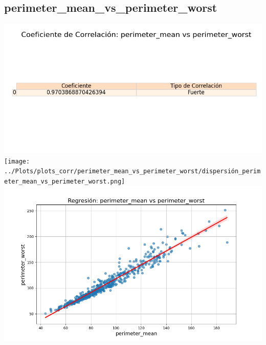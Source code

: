 \documentclass[a4paper, 12pt]{article}
\begin{document}
\subsection{perimeter\_mean\_vs\_perimeter\_worst}
    \includegraphics[width = \textwidth]{../Plots/plots_corr/perimeter_mean_vs_perimeter_worst/coeficiente_correlacion_perimeter_mean_vs_perimeter_worst.png}
    \texttt{[image: ../Plots/plots\_corr/perimeter\_mean\_vs\_perimeter\_worst/dispersión\_perimeter\_mean\_vs\_perimeter\_worst.png]}
    \includegraphics[width = \textwidth]{../Plots/plots_corr/perimeter_mean_vs_perimeter_worst/regresion_perimeter_mean_vs_perimeter_worst.png}
\end{document}
